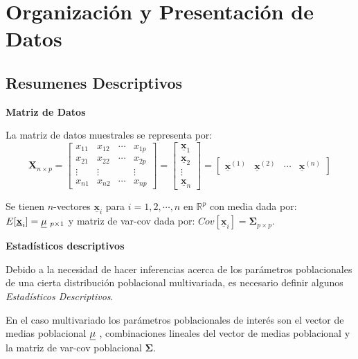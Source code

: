 \documentclass[
]{book}
\theoremstyle{definition}
\theoremstyle{definition}
\theoremstyle{definition}
\theoremstyle{definition}
\theoremstyle{remark}
\begin{document}
\hypertarget{org_pres_dat}{%
\section{Organización y Presentación de Datos}\label{org_pres_dat}}

\hypertarget{resumenes-descriptivos}{%
\subsection{Resumenes Descriptivos}\label{resumenes-descriptivos}}

\textbf{Matriz de Datos}

La matriz de datos muestrales se representa por:
\[
\mathbf{X}_{n\times p}=\begin{bmatrix}
x_{11} & x_{12} & \cdots & x_{1p}\\
x_{21} & x_{22} & \cdots & x_{2p}\\
\vdots & \vdots & & \vdots \\
x_{n1} & x_{n2} & \cdots & x_{np}
\end{bmatrix}=
\begin{bmatrix}
\underline{\mathbf{x}}_1 \\ \underline{\mathbf{x}}_2 \\ \vdots \\ \underline{\mathbf{x}}_n
\end{bmatrix}=
\begin{bmatrix}
\underline{\mathbf{x}}^{(1)} & \underline{\mathbf{x}}^{(2)} & \cdots & \underline{\mathbf{x}}^{(n)}
\end{bmatrix}
\]

Se tienen \(n\)-vectores \(\underline{\mathbf{x}}_i\) para \(i=1,2,\cdots,n\) en \(\mathbb{R}^p\) con media dada por: \(E[\underline{\mathbf{x}}_i]=
{\large \underline{\mathbf{\mu}}}\ _{p\times 1}\) y matriz de var-cov dada por: \(Cov[\underline{\mathbf{x}}_i]=\mathbf{\Sigma}_{p\times p}\).

\textbf{Estadísticos descriptivos}

Debido a la necesidad de hacer inferencias acerca de los parámetros poblacionales de una cierta distribución poblacional multivariada, es necesario definir algunos \emph{Estadísticos Descriptivos}.

En el caso multivariado los parámetros poblacionales de interés son el vector de medias poblacional \(
{\large \underline{\mathbf{\mu}}}\ \), combinaciones lineales del vector de medias poblacional y la matriz de var-cov poblacional \(\mathbf{\mathbf{\Sigma}}\).
\end{document}
